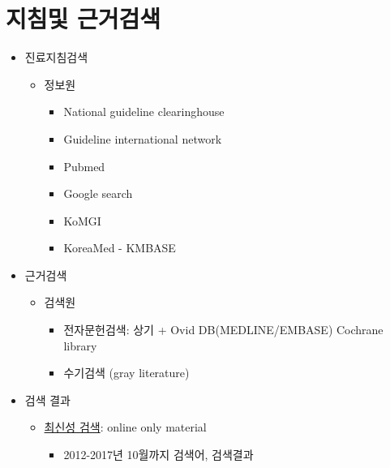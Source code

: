 \documentclass[]{book}
\providecommand{\tightlist}{%
  \setlength{\itemsep}{0pt}\setlength{\parskip}{0pt}}
\begin{document}
\hypertarget{section-55}{%
\section{지침및 근거검색}\label{section-55}}

\begin{itemize}
\tightlist
\item
  진료지침검색

  \begin{itemize}
  \tightlist
  \item
    정보원

    \begin{itemize}
    \tightlist
    \item
      National guideline clearinghouse
    \item
      Guideline international network
    \item
      Pubmed
    \item
      Google search
    \item
      KoMGI
    \item
      KoreaMed - KMBASE
    \end{itemize}
  \end{itemize}
\item
  근거검색

  \begin{itemize}
  \tightlist
  \item
    검색원

    \begin{itemize}
    \tightlist
    \item
      전자문헌검색: 상기 + Ovid DB(MEDLINE/EMBASE) Cochrane library
    \item
      수기검색 (gray literature)
    \end{itemize}
  \end{itemize}
\item
  검색 결과

  \begin{itemize}
  \tightlist
  \item
    \href{static/SearchingResult_\%20201710.pdf}{최신성 검색}: online only material

    \begin{itemize}
    \tightlist
    \item
      2012-2017년 10월까지 검색어, 검색결과
    \end{itemize}
  \end{itemize}
\end{itemize}
\end{document}
